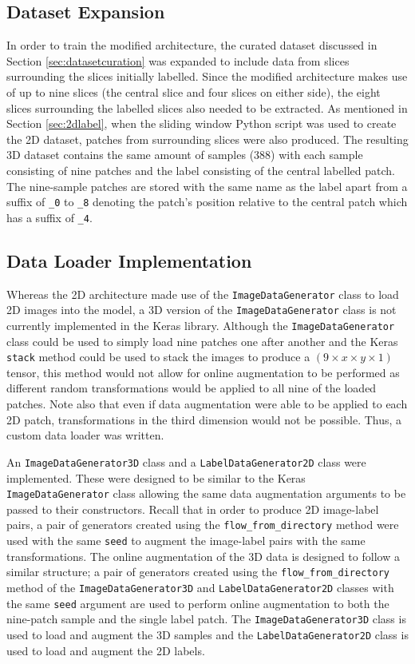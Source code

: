 \subsection{Dataset Expansion}

In order to train the modified architecture, the curated dataset discussed in Section \ref{sec:datasetcuration} was expanded to include data from slices surrounding the slices initially labelled. Since the modified architecture makes use of up to nine slices (the central slice and four slices on either side), the eight slices surrounding the labelled slices also needed to be extracted. As mentioned in Section \ref{sec:2dlabel}, when the sliding window Python script was used to create the 2D dataset, patches from surrounding slices were also produced. The resulting 3D dataset contains the same amount of samples (388) with each sample consisting of nine patches and the label consisting of the central labelled patch. The nine-sample patches are stored with the same name as the label apart from a suffix of \texttt{\_0} to \texttt{\_8} denoting the patch's position relative to the central patch which has a suffix of \texttt{\_4}.

\subsection{Data Loader Implementation}

Whereas the 2D architecture made use of the \texttt{ImageDataGenerator} class to load 2D images into the model, a 3D version of the \texttt{ImageDataGenerator} class is not currently implemented in the Keras library. Although the \texttt{ImageDataGenerator} class could be used to simply load nine patches one after another and the Keras \texttt{stack} method could be used to stack the images to produce a $(9 \times x \times y \times 1)$ tensor, this method would not allow for online augmentation to be performed as different random transformations would be applied to all nine of the loaded patches. Note also that even if data augmentation were able to be applied to each 2D patch, transformations in the third dimension would not be possible. Thus, a custom data loader was written.

An \texttt{ImageDataGenerator3D} class and a \texttt{LabelDataGenerator2D} class were implemented. These were designed to be similar to the Keras \texttt{ImageDataGenerator} class allowing the same data augmentation arguments to be passed to their constructors. Recall that in order to produce 2D image-label pairs, a pair of generators created using the \texttt{flow\_from\_directory} method were used with the same \texttt{seed} to augment the image-label pairs with the same transformations. The online augmentation of the 3D data is designed to follow a similar structure; a pair of generators created using the \texttt{flow\_from\_directory} method of the \texttt{ImageDataGenerator3D} and \texttt{LabelDataGenerator2D} classes with the same \texttt{seed} argument are used to perform online augmentation to both the nine-patch sample and the single label patch. The \texttt{ImageDataGenerator3D} class is used to load and augment the 3D samples and the \texttt{LabelDataGenerator2D} class is used to load and augment the 2D labels.

